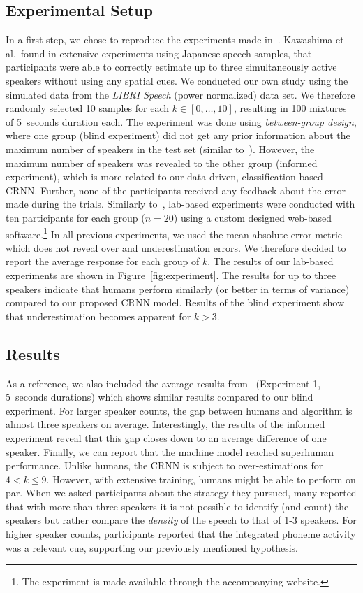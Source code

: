\subsection{Experimental Setup}
In a first step, we chose to reproduce the experiments made in~\cite{kawashima15, kashino96}.
Kawashima et al.\ found in extensive experiments using Japanese speech samples, that participants were able to correctly estimate up to three simultaneously active speakers without using any spatial cues.
We conducted our own study using the simulated data from the \emph{LIBRI Speech} (power normalized) data set.
We therefore randomly selected 10 samples for each \(k \in [0, \ldots, 10]\), resulting in 100 mixtures of 5~seconds duration each.
The experiment was done using \emph{between-group design}, where one group (blind experiment) did not get any prior information about the maximum number of speakers in the test set (similar to~\cite{kawashima15}).
However, the maximum number of speakers was revealed to the other group (informed experiment), which is more related to our data-driven, classification based CRNN.
Further, none of the participants received any feedback about the error made during the trials.
Similarly to~\cite{kawashima15}, lab-based experiments were conducted with ten participants for each group (\(n=20\)) using a custom designed web-based software.\footnote{The experiment is made available through the accompanying website.}
In all previous experiments, we used the mean absolute error metric which does not reveal over and underestimation errors.
We therefore decided to report the average response for each group of \(k\).
The results of our lab-based experiments are shown in Figure~\ref{fig:experiment}.
The results for up to three speakers indicate that humans perform similarly (or better in terms of variance) compared to our proposed CRNN model.
Results of the blind experiment show that underestimation becomes apparent for \(k > 3\).
\subsection{Results}
As a reference, we also included the average results from~\cite{kawashima15} (Experiment 1, 5~seconds durations) which shows similar results compared to our blind experiment.
For larger speaker counts, the gap between humans and algorithm is almost three speakers on average.
Interestingly, the results of the informed experiment reveal that this gap closes down to an average difference of one speaker.
Finally, we can report that the machine model reached superhuman performance.
Unlike humans, the CRNN is subject to over-estimations for \(4 < k \leq 9\).
However, with extensive training, humans might be able to perform on par.
When we asked participants about the strategy they pursued, many reported that with more than three speakers it is not possible to identify (and count) the speakers but rather compare the \emph{density} of the speech to that of 1-3 speakers.
For higher speaker counts, participants reported that the integrated phoneme activity was a relevant cue, supporting our previously mentioned hypothesis.

